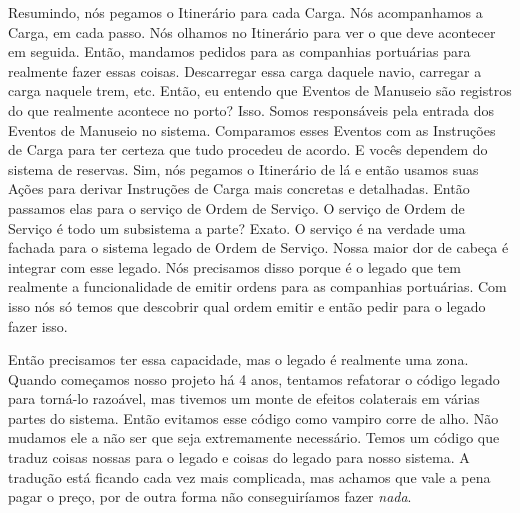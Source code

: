 \documentclass[12pt,play]{article}
\begin{document}
\scene
\julian Resumindo, nós pegamos o Itinerário para cada Carga. Nós acompanhamos a Carga, em cada passo. Nós olhamos no Itinerário para ver o que deve acontecer em seguida. Então, mandamos pedidos para as companhias portuárias para realmente fazer essas coisas. Descarregar essa carga daquele navio, carregar a carga naquele trem, etc.
\dani Então, eu entendo que Eventos de Manuseio são registros do que realmente acontece no porto?
\julian Isso. Somos responsáveis pela entrada dos Eventos de Manuseio no sistema. Comparamos esses Eventos com as Instruções de Carga para ter certeza que tudo procedeu de acordo.
\dani E vocês dependem do sistema de reservas.
\julian Sim, nós pegamos o Itinerário de lá e então usamos suas Ações para derivar Instruções de Carga mais concretas e detalhadas. Então passamos elas para o serviço de Ordem de Serviço.
\dani O serviço de Ordem de Serviço é todo um subsistema a parte?
\julian Exato. O serviço é na verdade uma fachada para o sistema legado de Ordem de Serviço. Nossa maior dor de cabeça é integrar com esse legado. Nós precisamos disso porque é o legado que tem realmente a funcionalidade de emitir ordens para as companhias portuárias. Com isso nós só temos que descobrir qual ordem emitir e então pedir para o legado fazer isso.

Então precisamos ter essa capacidade, mas o legado é realmente uma zona. Quando começamos nosso projeto há 4 anos, tentamos refatorar o código legado para torná-lo razoável, mas tivemos um monte de efeitos colaterais em várias partes do sistema. Então evitamos esse código como vampiro corre de alho. Não mudamos ele a não ser que seja extremamente necessário. Temos um código que traduz coisas nossas para o legado e coisas do legado para nosso sistema. A tradução está ficando cada vez mais complicada, mas achamos que vale a pena pagar o preço, por de outra forma não conseguiríamos fazer \emph{nada}.
\narr {}
\end{document}
